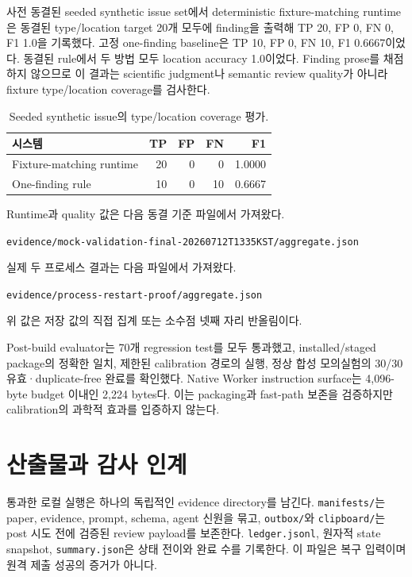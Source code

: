 \documentclass[11pt,a4paper]{article}
\begin{document}
사전 동결된 seeded synthetic issue set에서 deterministic fixture-matching
runtime은 동결된 type/location target 20개 모두에 finding을 출력해 TP 20, FP 0,
FN 0, F1 1.0을 기록했다. 고정 one-finding baseline은 TP 10, FP 0, FN 10, F1
0.6667이었다. 동결된 rule에서 두 방법 모두 location accuracy 1.0이었다.
Finding prose를 채점하지 않으므로 이 결과는 scientific judgment나 semantic
review quality가 아니라 fixture type/location coverage를 검사한다.

\begin{table}[H]
  \caption{Seeded synthetic issue의 type/location coverage 평가.}
  \label{tab:quality}
  \centering
  \small
  \begin{tabular}{@{}lrrrr@{}}
    \toprule
    시스템 & TP & FP & FN & F1 \\
    \midrule
    Fixture-matching runtime & 20 & 0 & 0 & 1.0000 \\
    One-finding rule & 10 & 0 & 10 & 0.6667 \\
    \bottomrule
  \end{tabular}
\end{table}

Runtime과 quality 값은 다음 동결 기준 파일에서 가져왔다.
\begin{center}
\small\nolinkurl{evidence/mock-validation-final-20260712T1335KST/aggregate.json}
\end{center}
실제 두 프로세스 결과는 다음 파일에서 가져왔다.
\begin{center}
\small\nolinkurl{evidence/process-restart-proof/aggregate.json}
\end{center}
위 값은 저장 값의 직접 집계 또는 소수점 넷째 자리 반올림이다.

Post-build evaluator는 70개 regression test를 모두 통과했고,
installed/staged package의 정확한 일치, 제한된 calibration 경로의 실행,
정상 합성 모의실험의 30/30 유효·duplicate-free 완료를 확인했다. Native
Worker instruction surface는
4,096-byte budget 이내인 2,224 bytes다. 이는 packaging과 fast-path 보존을
검증하지만 calibration의 과학적 효과를 입증하지 않는다.

\section{산출물과 감사 인계}

통과한 로컬 실행은 하나의 독립적인 evidence directory를 남긴다.
\texttt{manifests/}는 paper, evidence, prompt, schema, agent 신원을 묶고,
\texttt{outbox/}와 \texttt{clipboard/}는 post 시도 전에 검증된 review payload를
보존한다. \texttt{ledger.jsonl}, 원자적 state snapshot, \texttt{summary.json}은
상태 전이와 완료 수를 기록한다. 이 파일은 복구 입력이며 원격 제출 성공의
증거가 아니다.
\end{document}
